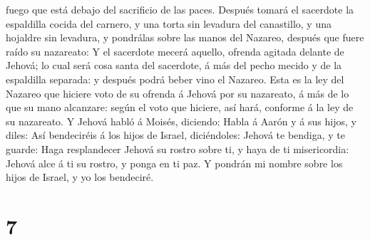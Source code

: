 fuego que está debajo del sacrificio de las paces.  Después
tomará el sacerdote la espaldilla cocida del carnero, y una torta sin
levadura del canastillo, y una hojaldre sin levadura, y pondrálas sobre
las manos del Nazareo, después que fuere raído su nazareato:
 Y el sacerdote mecerá aquello, ofrenda agitada delante de
Jehová; lo cual será cosa santa del sacerdote, á más del pecho mecido y
de la espaldilla separada: y después podrá beber vino el Nazareo.
 Esta es la ley del Nazareo que hiciere voto de su ofrenda
á Jehová por su nazareato, á más de lo que su mano alcanzare: según el
voto que hiciere, así hará, conforme á la ley de su nazareato.
 Y Jehová habló á Moisés, diciendo:  Habla á
Aarón y á sus hijos, y diles: Así bendeciréis á los hijos de Israel,
diciéndoles:  Jehová te bendiga, y te guarde: 
Haga resplandecer Jehová su rostro sobre ti, y haya de ti misericordia:
 Jehová alce á ti su rostro, y ponga en ti paz.
 Y pondrán mi nombre sobre los hijos de Israel, y yo los
bendeciré.

\hypertarget{section-6}{%
\section{7}\label{section-6}}

